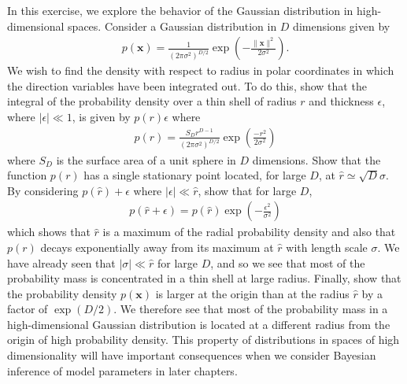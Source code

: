 \begin{question}{1.20}
	In this exercise, we explore the behavior of the Gaussian distribution in high-dimensional spaces. Consider a Gaussian distribution in $D$ dimensions given by
	\begin{align*}
		p(\bm{x}) = \frac{1}{(2\pi\sigma^2)^{D/2}} \exp\left( -\frac{\lVert \bm{x} \rVert^2}{2\sigma^2} \right).
	\end{align*}
	We wish to find the density with respect to radius in polar coordinates in which the direction variables have been integrated out. To do this, show that the integral of the probability density over a thin shell of radius $r$ and thickness $\epsilon$, where $|\epsilon| \ll 1$, is given by $p(r)\epsilon$ where
	\begin{align*}
		p(r) = \frac{S_D r^{D-1}}{(2\pi\sigma^2)^{D/2}} \exp \left( \frac{-r^2}{2\sigma^2} \right)
	\end{align*}
	where $S_D$ is the surface area of a unit sphere in $D$ dimensions. Show that the function $p(r)$ has a single stationary point located, for large $D$, at $\hat{r} \simeq \sqrt{D}\sigma$. By considering $p(\hat{r}) + \epsilon$ where $|\epsilon| \ll \hat{r}$, show that for large $D$,
	\begin{align*}
		p(\hat{r} + \epsilon) = p(\hat{r}) \exp \left( -\frac{\epsilon^2}{\sigma^2} \right)
	\end{align*}
	which shows that $\hat{r}$ is a maximum of the radial probability density and also that $p(r)$ decays exponentially away from its maximum at $\hat{r}$ with length scale $\sigma$. We have already seen that $|\sigma| \ll \hat{r}$ for large $D$, and so we see that most of the probability mass is concentrated in a thin shell at large radius. Finally, show that the probability density $p(\bm{x})$ is larger at the origin than at the radius $\hat{r}$ by a factor of $\exp(D/2)$. We therefore see that most of the probability mass in a high-dimensional Gaussian distribution is located at a different radius from the origin of high probability density. This property of distributions in spaces of high dimensionality will have important consequences when we consider Bayesian inference of model parameters in later chapters. 
\end{question}

